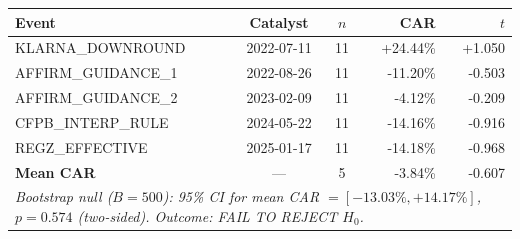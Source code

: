 \begin{tabular}{lccrr}
\toprule
Event & Catalyst & $n$ & CAR & $t$ \\
\midrule
KLARNA\_DOWNROUND & 2022-07-11 & 11 & +24.44\% & +1.050 \\
AFFIRM\_GUIDANCE\_1 & 2022-08-26 & 11 & -11.20\% & -0.503 \\
AFFIRM\_GUIDANCE\_2 & 2023-02-09 & 11 & -4.12\% & -0.209 \\
CFPB\_INTERP\_RULE & 2024-05-22 & 11 & -14.16\% & -0.916 \\
REGZ\_EFFECTIVE & 2025-01-17 & 11 & -14.18\% & -0.968 \\
\midrule
\textbf{Mean CAR} & --- & 5 & -3.84\% & -0.607 \\
\midrule
\multicolumn{5}{l}{\emph{Bootstrap null ($B=500$): 95\% CI for mean CAR $=[-13.03\%, +14.17\%]$, $p=0.574$ (two-sided). Outcome: FAIL TO REJECT $H_0$.}} \\
\bottomrule
\end{tabular}
